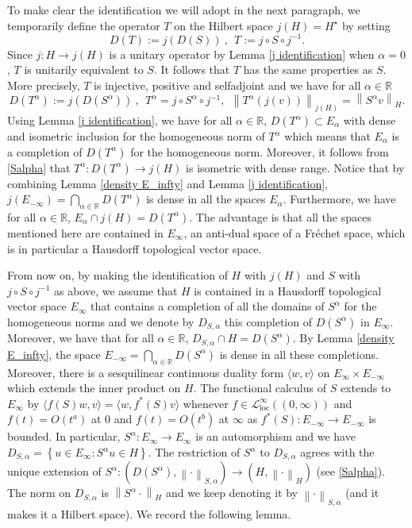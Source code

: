 \documentclass[11pt, letterpaper]{amsart}
\theoremstyle{definition}
\theoremstyle{remark}
\numberwithin{equation}{section}
\begin{document}
To make clear the identification we will adopt in the next paragraph, we temporarily define the operator $T$ on the Hilbert space $j(H)=H^\star$ by setting 
\begin{equation*}
    D(T):=j(D(S)) \ , \ \ T:=j \circ S \circ j^{-1}.
\end{equation*}
Since $j: H \rightarrow j(H)$ is a unitary operator by Lemma \ref{j identification} when $\alpha=0$, $T$ is unitarily equivalent to $S$. It follows that $T$ has the same properties as $S$. More precisely, $T$ is injective, positive and selfadjoint and we have for all $\alpha \in \mathbb{R}$
$$D(T^\alpha):= j(D(S^\alpha))\ , \ \ T^\alpha= j \circ S^\alpha \circ j^{-1}, \ \ \left \| T^\alpha (j(v))  \right \|_{j(H)}=\left \| S^\alpha v  \right \|_{H}.$$
Using Lemma \ref{j identification}, we have for all $\alpha \in \mathbb{R}$, $D(T^\alpha) \subset E_\alpha$ with dense and isometric inclusion for the homogeneous norm of $T^\alpha$ which means that $E_\alpha$ is a completion of $D(T^\alpha)$ for the homogeneous norm. Moreover, it follows from \eqref{Salpha} that $T^\alpha: D(T^\alpha) \rightarrow j(H)$ is isometric with dense range. Notice that by combining Lemma \ref{density E_infty} and Lemma \ref{j identification}, $j(E_{-\infty})=\bigcap_{\alpha \in \mathbb{R}} D(T^{\alpha })$ is dense in all the spaces $E_\alpha$. {Furthermore, we have for all $\alpha \in \mathbb{R}$, $E_\alpha \cap j(H)= D(T^\alpha)$}. The advantage is that all the spaces mentioned here are contained in $E_\infty$, an anti-dual space of a Fréchet space, which is in particular a Hausdorff topological vector space.

From now on, by making the identification of $H$ with $j(H)$ and $S$ with $j\circ S \circ j^{-1}$ as above, we assume that $H$ is contained in a Hausdorff topological vector space $E_\infty$ that contains a completion of all the domains of $S^\alpha$ for the homogeneous norms and we denote by $D_{S,\alpha}$ this completion of $D(S^\alpha)$ in $E_\infty$. Moreover, we  have that for all $\alpha \in \mathbb{R}$, $D_{S,\alpha}\cap H = D(S^\alpha)$.
By Lemma \ref{density E_infty}, the space $E_{-\infty} = \bigcap_{\alpha \in \mathbb{R}} D(S^\alpha )$ is dense in all these completions. Moreover, there is a sesquilinear continuous duality form $\langle w, v\rangle$ on $E_\infty\times E_{-\infty}$ which extends the inner product on $H$. The functional calculus of $S$ extends to $E_\infty$ by $\langle f(S)w, v\rangle= \langle w, f^*(S)v\rangle$ whenever {$f\in \mathcal{L}^\infty_{\mathrm{loc}}((0,\infty))$ and $f(t)=O(t^a)$ at  $0$ and $f(t)=O(t^b)$ at $\infty$} as $f^*(S):E_{-\infty}\to E_{-\infty}$ is bounded. In particular, $S^\alpha: E_\infty \to E_\infty$ is an automorphism and we have $D_{S,\alpha}=\left\{u \in E_\infty  :  S^\alpha u \in H \right\}$. The restriction of $S^\alpha$ to $D_{S,\alpha}$  agrees with  the unique extension of $S^{\alpha}:  (D(S^{\alpha}),  \left\| \cdot \right\|_{S,\alpha}  ) \rightarrow \left ( H, \left\| \cdot \right\|_H \right )$ (see \eqref{Salpha}). The norm on $D_{S,\alpha}$ is $\left \| S^\alpha \cdot \right \|_H$ and we keep denoting it by $\left \|  \cdot \right \|_{S,\alpha}$ (and it makes it a Hilbert space). We record the following lemma.
 
\end{document}
